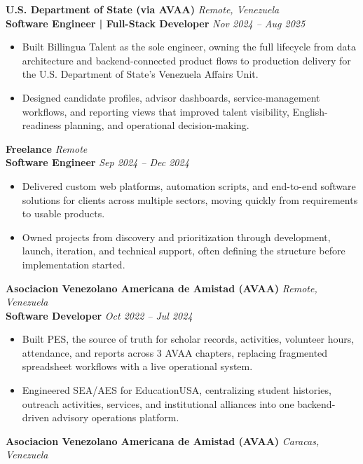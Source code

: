 \documentclass[11pt]{article}
\begin{document}
\vspace{10pt}
\textbf{U.S. Department of State (via AVAA)} \hfill \textit{Remote, Venezuela} \\
\textbf{Software Engineer | Full-Stack Developer} \hfill \textit{Nov 2024 -- Aug 2025}
\begin{itemize}
    \item Built Billingua Talent as the sole engineer, owning the full lifecycle from data architecture and backend-connected product flows to production delivery for the U.S. Department of State's Venezuela Affairs Unit.
    \item Designed candidate profiles, advisor dashboards, service-management workflows, and reporting views that improved talent visibility, English-readiness planning, and operational decision-making.
\end{itemize}
\vspace{10pt}
\textbf{Freelance} \hfill \textit{Remote} \\
\textbf{Software Engineer} \hfill \textit{Sep 2024 -- Dec 2024}
\begin{itemize}
    \item Delivered custom web platforms, automation scripts, and end-to-end software solutions for clients across multiple sectors, moving quickly from requirements to usable products.
    \item Owned projects from discovery and prioritization through development, launch, iteration, and technical support, often defining the structure before implementation started.
\end{itemize}
\vspace{10pt}
\textbf{Asociacion Venezolano Americana de Amistad (AVAA)} \hfill \textit{Remote, Venezuela} \\
\textbf{Software Developer} \hfill \textit{Oct 2022 -- Jul 2024}
\begin{itemize}
    \item Built PES, the source of truth for scholar records, activities, volunteer hours, attendance, and reports across 3 AVAA chapters, replacing fragmented spreadsheet workflows with a live operational system.
    \item Engineered SEA/AES for EducationUSA, centralizing student histories, outreach activities, services, and institutional alliances into one backend-driven advisory operations platform.
\end{itemize}
\vspace{10pt}
\textbf{Asociacion Venezolano Americana de Amistad (AVAA)} \hfill \textit{Caracas, Venezuela} \\
\end{document}
